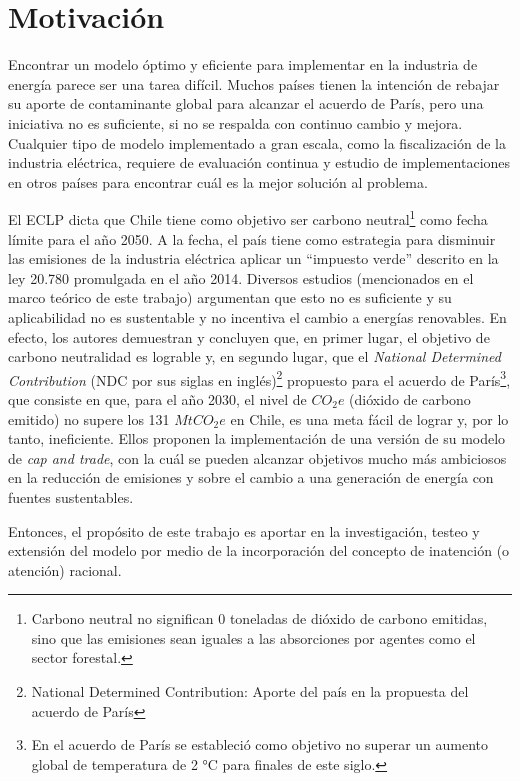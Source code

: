 \section{Motivación}
Encontrar un modelo óptimo y eficiente para implementar en la industria de energía parece ser una tarea difícil. Muchos países tienen la intención de rebajar su aporte de contaminante global para alcanzar el acuerdo de París, pero una iniciativa no es suficiente, si no se respalda con continuo cambio y mejora. Cualquier tipo de modelo implementado a gran escala, como la fiscalización de la industria eléctrica, requiere de evaluación continua y estudio de implementaciones en otros países para encontrar cuál es la mejor solución al problema.
\vspace{2.5mm}

El ECLP dicta que Chile tiene como objetivo ser carbono neutral\footnote{Carbono neutral no significan 0 toneladas de dióxido de carbono emitidas, sino que las emisiones sean iguales a las absorciones por agentes como el sector forestal.} como fecha límite para el año 2050. A la fecha, el país tiene como estrategia para disminuir las emisiones de la industria eléctrica aplicar un ``impuesto verde'' descrito en la ley 20.780 promulgada en el año 2014. Diversos estudios (mencionados en el marco teórico de este trabajo) argumentan que esto no es suficiente y su aplicabilidad no es sustentable y no incentiva el cambio a energías renovables. En efecto, los autores  demuestran y concluyen que, en primer lugar, el objetivo de carbono neutralidad es lograble y, en segundo lugar, que el \emph{National Determined Contribution}  (NDC por sus siglas en inglés)\footnote{National Determined Contribution: Aporte del país en la propuesta del acuerdo de París}  propuesto para el acuerdo de París\footnote{En el acuerdo de París se estableció como objetivo no superar un aumento global de temperatura de 2 °C para finales de este siglo.}, que consiste en que, para el año 2030, el nivel de $CO_2 e$ (dióxido de carbono emitido) no supere los 131 $MtCO_2 e$ en Chile, es una meta fácil de lograr y, por lo tanto, ineficiente. Ellos proponen la implementación de una versión de su modelo de \emph{cap and trade}, con la cuál se pueden alcanzar objetivos mucho más ambiciosos en la reducción de emisiones y sobre el cambio a una generación de energía con fuentes sustentables.
\vspace{2.5mm}

Entonces, el propósito de este trabajo es aportar en la investigación, testeo y extensión del modelo por medio de la incorporación del concepto de inatención (o atención) racional.
\vspace{2.5mm}

